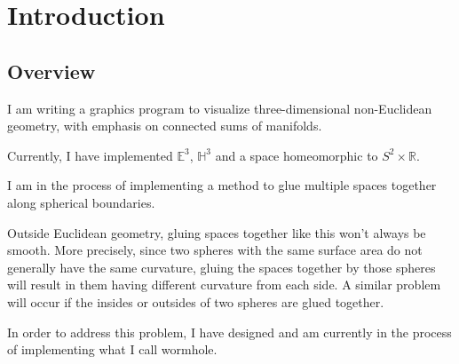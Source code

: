 \section{Introduction}

\subsection{Overview}

I am writing a graphics program to visualize three-dimensional non-Euclidean geometry, with emphasis on connected sums of manifolds.

Currently, I have implemented $\mathbb{E}^3$, $\mathbb{H}^3$ and a space homeomorphic to $S^2 \times \mathbb{R}$.

I am in the process of implementing a method to glue multiple spaces together along spherical boundaries.

Outside Euclidean geometry, gluing spaces together like this won't always be smooth. More precisely, since two spheres with the same surface area do not generally have the same curvature, gluing the spaces together by those spheres will result in them having different curvature from each side. A similar problem will occur if the insides or outsides of two spheres are glued together.

In order to address this problem, I have designed and am currently in the process of implementing what I call wormhole.


